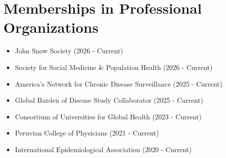 \section{Memberships in Professional Organizations}
\begin{itemize}
 \item John Snow Society (2026 - Current)
 \item Society for Social Medicine \& Population Health (2026 - Current)
 \item America's Network for Chronic Disease Surveillance (2025 - Current)
 \item Global Burden of Disease Study Collaborator (2025 - Current)
 \item Consortium of Universities for Global Health (2023 - Current)
 \item Peruvian College of Physicians (2021 - Current)
 \item International Epidemiological Association (2020 - Current)
\end{itemize}
